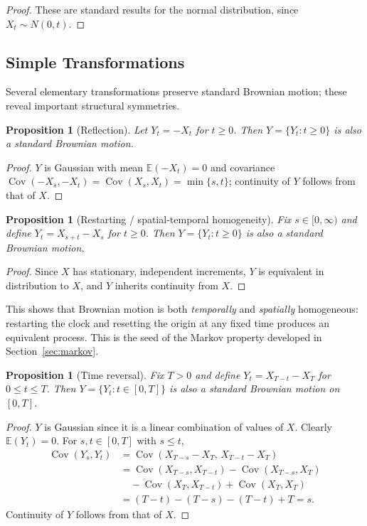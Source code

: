 \documentclass[12pt,openany]{book}
\newtheorem{proposition}[theorem]{Proposition}
\theoremstyle{definition}
\theoremstyle{remark}
\newcommand{\E}{\mathbb{E}}
\DeclareMathOperator{\Cov}{Cov}
\begin{document}
\begin{proof}
These are standard results for the normal distribution, since $X_t \sim N(0,t)$.
\end{proof}
 
\subsection{Simple Transformations}
 
Several elementary transformations preserve standard Brownian motion; these reveal important structural symmetries.
 
\begin{proposition}[Reflection]
Let $Y_t = -X_t$ for $t \ge 0$. Then $Y = \{Y_t : t \ge 0\}$ is also a standard Brownian motion.
\end{proposition}
\begin{proof}
$Y$ is Gaussian with mean $\E(-X_t) = 0$ and covariance $\Cov(-X_s,-X_t) = \Cov(X_s,X_t) = \min\{s,t\}$; continuity of $Y$ follows from that of $X$.
\end{proof}
 
\begin{proposition}[Restarting / spatial-temporal homogeneity]
Fix $s \in [0,\infty)$ and define $Y_t = X_{s+t} - X_s$ for $t \ge 0$. Then $Y=\{Y_t : t\ge 0\}$ is also a standard Brownian motion.
\end{proposition}
\begin{proof}
Since $X$ has stationary, independent increments, $Y$ is equivalent in distribution to $X$, and $Y$ inherits continuity from $X$.
\end{proof}
 
This shows that Brownian motion is both \emph{temporally} and \emph{spatially} homogeneous: restarting the clock and resetting the origin at any fixed time produces an equivalent process. This is the seed of the Markov property developed in Section~\ref{sec:markov}.
 
\begin{proposition}[Time reversal]
Fix $T>0$ and define $Y_t = X_{T-t} - X_T$ for $0 \le t \le T$. Then $Y = \{Y_t : t\in[0,T]\}$ is also a standard Brownian motion on $[0,T]$.
\end{proposition}
\begin{proof}
$Y$ is Gaussian since it is a linear combination of values of $X$. Clearly $\E(Y_t) = 0$. For $s,t \in [0,T]$ with $s \le t$,
\[
    \begin{aligned}
    \Cov(Y_s,Y_t)
    &=\Cov(X_{T-s}-X_T,\,X_{T-t}-X_T)\\
    &=\Cov(X_{T-s},X_{T-t})-\Cov(X_{T-s},X_T)\\
    &\quad-\Cov(X_T,X_{T-t})+\Cov(X_T,X_T)\\
    &=(T-t)-(T-s)-(T-t)+T=s.
    \end{aligned}
\]
Continuity of $Y$ follows from that of $X$.
\end{proof}
 
\end{document}

